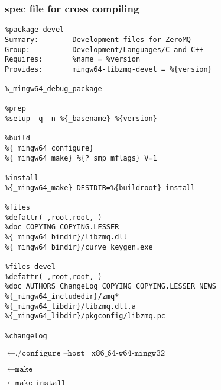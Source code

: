 \documentclass[compressed,dvips,letter]{beamer}
\begin{document}
\begin{frame}[fragile]\frametitle{spec file for cross compiling}

\begin{minipage}{0.44\textwidth}
{\tiny
\begin{verbatim}
%package devel
Summary:        Development files for ZeroMQ
Group:          Development/Languages/C and C++
Requires:       %name = %version
Provides:       mingw64-libzmq-devel = %{version}

%_mingw64_debug_package

%prep
%setup -q -n %{_basename}-%{version}

%build
%{_mingw64_configure}
%{_mingw64_make} %{?_smp_mflags} V=1

%install
%{_mingw64_make} DESTDIR=%{buildroot} install

%files
%defattr(-,root,root,-)
%doc COPYING COPYING.LESSER
%{_mingw64_bindir}/libzmq.dll
%{_mingw64_bindir}/curve_keygen.exe

%files devel
%defattr(-,root,root,-)
%doc AUTHORS ChangeLog COPYING COPYING.LESSER NEWS
%{_mingw64_includedir}/zmq*
%{_mingw64_libdir}/libzmq.dll.a
%{_mingw64_libdir}/pkgconfig/libzmq.pc

%changelog
\end{verbatim}
}
\end{minipage}
\begin{minipage}{0.55\textwidth}
{\footnotesize
$\longleftarrow \texttt{./configure --host=x86\_64-w64-mingw32}$

$\longleftarrow \texttt{make}$

\vspace{8pt}

$\longleftarrow \texttt{make install}$

\vspace{25pt}}
\end{minipage}
\end{frame}
%
%
\end{document}
